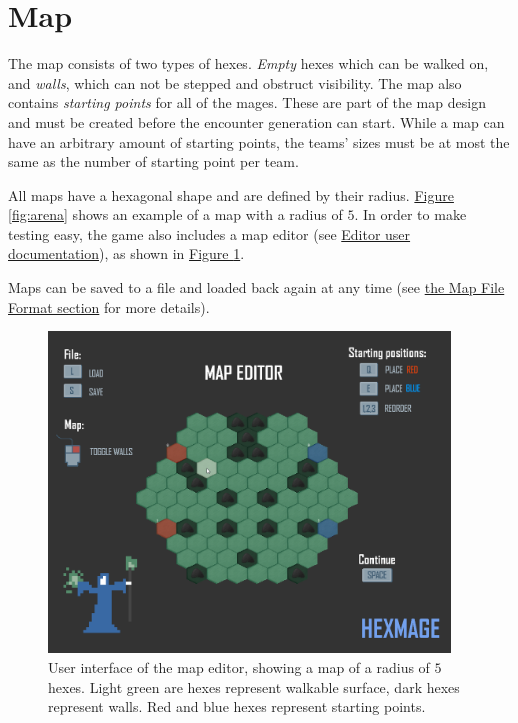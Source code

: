 \section{Map}

The map consists of two types of hexes. \emph{Empty} hexes which can be walked on,
and \emph{walls}, which can not be stepped and obstruct visibility. The map also contains \emph{starting points}
for all of the mages. These are part of the map design and must be created before the encounter generation can start. While a map can have an arbitrary amount of starting points, the teams' sizes must be at most the same as the number of starting point per team.

All maps have a hexagonal shape and are defined by their radius. \hyperref[fig:arena]{Figure \ref*{fig:arena}} shows an example of a map with a radius of $5$. In order to make testing easy, the game also includes a map editor (see \hyperref[editor]{Editor user documentation}), as shown in \hyperref[fig:map-editor]{Figure \ref*{fig:map-editor}}.

Maps can be saved to a file and loaded back again at any time (see \hyperref[map-format]{the Map File Format section} for more details).

\begin{figure}[h]
	\centering
	\includegraphics[width=0.95\textwidth]{img/map-editor.png}
	\caption{User interface of the map editor, showing a map of a radius of $5$ hexes. Light green are hexes represent walkable surface, dark hexes represent walls. Red and blue hexes represent starting points.}
	\label{fig:map-editor}
\end{figure}

